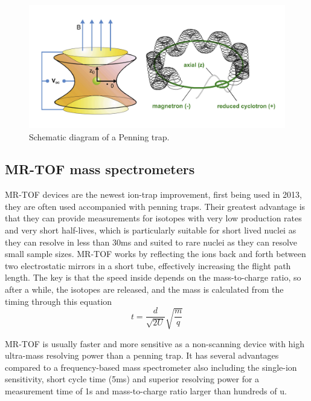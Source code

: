 \begin{figure}[H]
    \centering
    \includegraphics[width=.4\textwidth]{images/MS_penningtrap.png}
    \caption{Schematic diagram of a Penning trap.}\label{fig:MS_PT}
\end{figure}

\subsection{MR-TOF mass spectrometers}
MR-TOF devices are the newest ion-trap improvement, first being used in 2013, they are often used accompanied with penning traps.
Their greatest advantage is that they can provide measurements for isotopes with very low production rates and very short half-lives, which is particularly suitable for short lived nuclei as they can resolve in less than 30ms and suited to rare nuclei as they can resolve small sample sizes.
MR-TOF works by reflecting the ions back and forth between two electrostatic mirrors in a short tube, effectively increasing the flight path length.
The key is that the speed inside depends on the mass-to-charge ratio, so after a while, the isotopes are released, and the mass is calculated from the timing through this equation
\begin{equation}
    t = \frac{d}{\sqrt{2U}}\sqrt{\frac{m}{q}}
\end{equation}

MR-TOF is usually faster and more sensitive as a non-scanning device with high ultra-mass resolving power than a penning trap.
It has several advantages compared to a frequency-based mass spectrometer also including the single-ion sensitivity, short cycle time (5ms) and superior resolving power for a measurement time of 1s and mass-to-charge ratio larger than hundreds of u.
